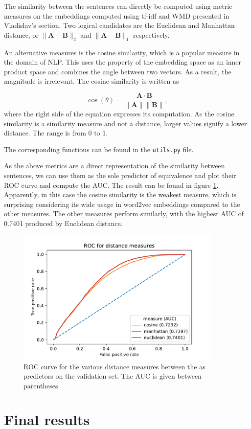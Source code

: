 \documentclass[11pt,a4paper]{article}
\begin{document}
The similarity between the sentences can directly be computed using metric measures on the embeddings computed using tf-idf and WMD presented in Vladislav's section. Two logical candidates are the Euclidean and Manhattan distance, or $\lVert \mathbf{A} - \mathbf{B}\rVert_2$ and $\lVert \mathbf{A} - \mathbf{B}\rVert_1$ respectively.

An alternative measures is the cosine similarity, which is a popular measure in the domain of NLP. This uses the property of the embedding space as an inner product space and combines the angle between two vectors. As a result, the magnitude is irrelevant. The cosine similarity is written as

$$
\cos(\theta)=\frac{\mathbf A\cdot \mathbf B}{\lVert \mathbf{A} \rVert \lVert \mathbf{B}\rVert},
$$
where the right side of the equation expresses its computation. As the cosine similarity is a similarity measure and not a distance, larger values signify a lower distance. The range is from 0 to 1.

The corresponding functions can be found in the \texttt{utils.py} file. 

As the above metrics are a direct representation of the similarity between sentences, we can use them as the sole predictor of equivalence and plot their ROC curve and compute the AUC. The result can be found in figure \ref{fig:roc}. Apparently, in this case the cosine similarity is the weakest measure, which is surprising considering its wide usage in word2vec embeddings compared to the other measures. The other measures perform similarly, with the highest AUC of 0.7401 produced by Euclidean distance.

\begin{figure}[h]
    \centering
    \includegraphics[width=0.9\textwidth]{img/roc}
    \caption{ROC curve for the various distance measures between the  as predictors on the validation set. The AUC is given between parentheses}
    \label{fig:roc}
\end{figure}

\section{Final results}

\nocite{*}





\end{document}

